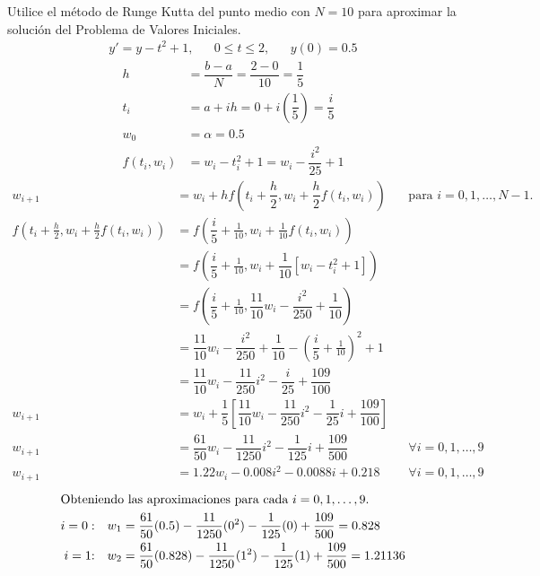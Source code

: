 \begin{exerciseT}{\rm
	Utilice el método de Runge Kutta del punto medio con $N=10$ para aproximar la solución del Problema de Valores Iniciales.
	\begin{align*}
		y'=y-t^2+1, && 0\leq t\leq 2, && y(0)=0.5
	\end{align*}
	\begin{align*}
		h &= \dfrac{b-a}{N} = \dfrac{2-0}{10} = \dfrac{1}{5}\\
		t_i &= a+ih = 0+ i\left(\dfrac{1}{5}\right) = \dfrac{i}{5}\\
		w_0 &= \alpha = 0.5\\
		f(t_i,w_i) &= w_i-t_i^2+1 = w_i - \dfrac{i^2}{25} + 1
	\end{align*}
	\begin{align*}
		w_{i+1} &= w_i + hf\left(t_i + \dfrac{h}{2}, w_i + \dfrac{h}{2}f(t_i,w_i) \right) && \mbox{para } i=0,1,\dots,N-1.\\
		f\left(t_i+\frac{h}{2}, w_i+\frac{h}{2}f(t_i,w_i)\right) &= f\left(\dfrac{i}{5}+\frac{1}{10}, w_i + \frac{1}{10}f(t_i,w_i)\right)\\
			&= f\left(\dfrac{i}{5}+\frac{1}{10}, w_i + \dfrac{1}{10}\left[w_i-t_i^2+1\right] \right)\\
			&= f\left(\dfrac{i}{5}+\frac{1}{10}, \dfrac{11}{10}w_i - \dfrac{i^2}{250} + \dfrac{1}{10} \right)\\
			&= \dfrac{11}{10}w_i - \dfrac{i^2}{250} + \dfrac{1}{10} - \left(\dfrac{i}{5}+\frac{1}{10}\right)^2 + 1\\
			&= \dfrac{11}{10}w_i - \dfrac{11}{250}i^2 - \dfrac{i}{25} + \dfrac{109}{100}\\
		w_{i+1} &= w_i + \dfrac{1}{5}\left[\dfrac{11}{10}w_i - \dfrac{11}{250}i^2 - \dfrac{1}{25}i + \dfrac{109}{100} \right]\\
		w_{i+1} &= \dfrac{61}{50}w_i - \dfrac{11}{1250}i^2 - \dfrac{1}{125}i + \dfrac{109}{500} && \forall i=0,1,\dots,9\\
		w_{i+1} &=1.22w_i - 0.008i^2 - 0.0088i + 0.218 && \forall i=0,1,\dots,9
	\end{align*}
	\begin{align*}
		\intertext{Obteniendo las aproximaciones para cada $i=0,1,\dots ,9$.}
		\mbox{$i=0:$} && w_1 &= \dfrac{61}{50}(0.5) - \dfrac{11}{1250}(0^2) - \dfrac{1}{125}(0) + \dfrac{109}{500} = 0.828\\
		\mbox{$i=1$:} && w_2 &= \dfrac{61}{50}(0.828) - \dfrac{11}{1250}(1^2) - \dfrac{1}{125}(1) + \dfrac{109}{500} = 1.21136\\

\end{align*}}
\end{exerciseT}

